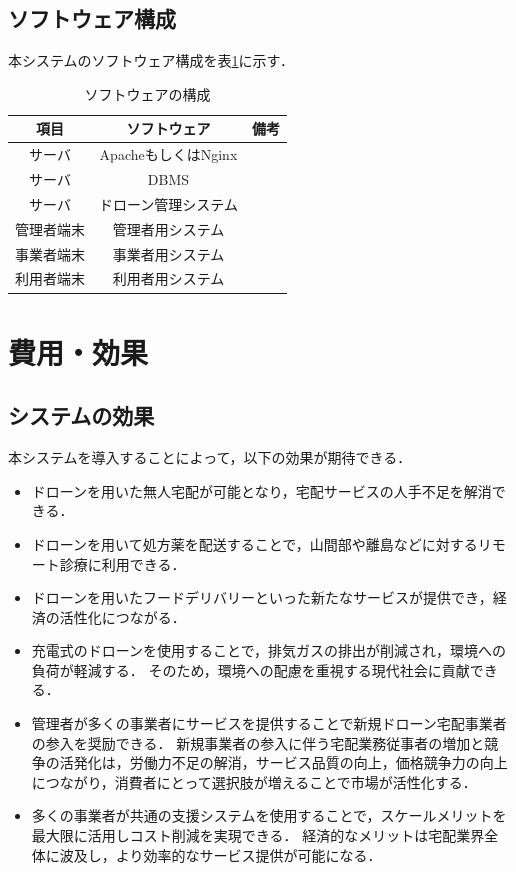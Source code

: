 \documentclass[a4paper, titlepage]{jsarticle}
\begin{document}
\subsection{ソフトウェア構成}
本システムのソフトウェア構成を表\ref{fig:software}に示す．
\begin{table}[H]
  \begin{center}
    \caption{ソフトウェアの構成}
    \label{fig:software}
    \begin{tabular}{ccc} \hline
      項目           & ソフトウェア & 備考     \\ \hline \hline
      サーバ       & ApacheもしくはNginx &        \\
      サーバ & DBMS  &        \\
      サーバ & ドローン管理システム & \\
      管理者端末        & 管理者用システム &   \\
      事業者端末        & 事業者用システム &         \\
      利用者端末        & 利用者用システム & \\ \hline
    \end{tabular}
  \end{center}
\end{table}

\section{費用・効果}
\subsection{システムの効果}
本システムを導入することによって，以下の効果が期待できる．
\begin{itemize}
\item ドローンを用いた無人宅配が可能となり，宅配サービスの人手不足を解消できる．
\item ドローンを用いて処方薬を配送することで，山間部や離島などに対するリモート診療に利用できる．
\item ドローンを用いたフードデリバリーといった新たなサービスが提供でき，経済の活性化につながる．
\item 充電式のドローンを使用することで，排気ガスの排出が削減され，環境への負荷が軽減する．
  そのため，環境への配慮を重視する現代社会に貢献できる．
  \item 管理者が多くの事業者にサービスを提供することで新規ドローン宅配事業者の参入を奨励できる．
        新規事業者の参入に伴う宅配業務従事者の増加と競争の活発化は，労働力不足の解消，サービス品質の向上，価格競争力の向上につながり，消費者にとって選択肢が増えることで市場が活性化する．

  \item 多くの事業者が共通の支援システムを使用することで，スケールメリットを最大限に活用しコスト削減を実現できる．
        経済的なメリットは宅配業界全体に波及し，より効率的なサービス提供が可能になる．
\end{itemize}
\end{document}
